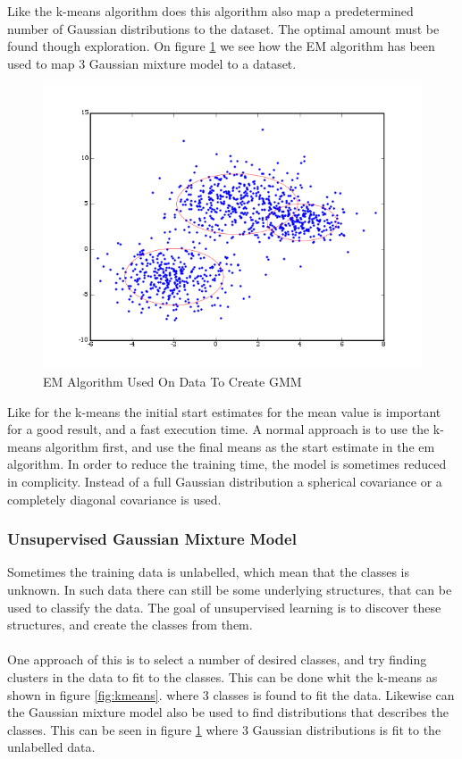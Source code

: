 Like the k-means algorithm does this algorithm also map a predetermined number of Gaussian distributions to the dataset. The optimal amount must be found though exploration. On figure \ref{fig:UGMM} we see how the EM algorithm has been used to map 3 Gaussian mixture model to a dataset. 

\begin{figure}[H]
\centering
\includegraphics[scale=0.5]{billeder/UGMM}
\caption{EM Algorithm Used On Data To Create GMM}
\label{fig:UGMM}
\end{figure}

Like for the k-means the initial start estimates for the mean value is important for a good result, and a fast execution time. A normal approach is to use the k-means algorithm first, and use the final means as the start estimate in the em algorithm. In order to reduce the training time, the model is sometimes reduced in complicity. Instead of a full Gaussian distribution a spherical covariance or a completely diagonal covariance is used. 

\subsubsection{Unsupervised Gaussian Mixture Model}
\label{sec:UGMM}
Sometimes the training data is unlabelled, which mean that the classes is unknown. In such data there can still be some underlying structures, that can be used to classify the data. The goal of unsupervised learning is to discover these structures, and create the classes from them. \\ \ \\
One approach of this is to select a number of desired classes, and try finding clusters in the data to fit to the classes. This can be done whit the k-means as shown in figure \ref{fig:kmeans}.  where 3 classes is found to fit the data. Likewise can the Gaussian mixture model also be used to find distributions that describes the classes. This can be seen in figure \ref{fig:UGMM} where 3 Gaussian distributions is fit to the unlabelled data. \\ \ \\

